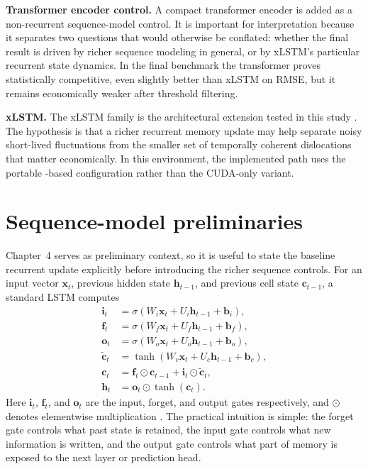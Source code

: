 \documentclass[12pt]{report}
\newcommand{\code}[1]{\begingroup\ttfamily\path{#1}\endgroup}
\begin{document}
\textbf{Transformer encoder control.} A compact transformer encoder \citep{vaswani2017} is added as a non-recurrent sequence-model control. It is important for interpretation because it separates two questions that would otherwise be conflated: whether the final result is driven by richer sequence modeling in general, or by xLSTM's particular recurrent state dynamics. In the final benchmark the transformer proves statistically competitive, even slightly better than xLSTM on RMSE, but it remains economically weaker after threshold filtering.

\textbf{xLSTM.} The xLSTM family is the architectural extension tested in this study \citep{beck2024xlstm}. The hypothesis is that a richer recurrent memory update may help separate noisy short-lived fluctuations from the smaller set of temporally coherent dislocations that matter economically. In this environment, the implemented path uses the portable \code{mLSTM}-based configuration rather than the CUDA-only \code{sLSTM} variant.

\section{Sequence-model preliminaries}
Chapter~4 serves as preliminary context, so it is useful to state the baseline recurrent update explicitly before introducing the richer sequence controls. For an input vector \(\mathbf{x}_t\), previous hidden state \(\mathbf{h}_{t-1}\), and previous cell state \(\mathbf{c}_{t-1}\), a standard LSTM computes
\begin{align}
\mathbf{i}_t &= \sigma\!\left(W_i \mathbf{x}_t + U_i \mathbf{h}_{t-1} + \mathbf{b}_i\right), \\
\mathbf{f}_t &= \sigma\!\left(W_f \mathbf{x}_t + U_f \mathbf{h}_{t-1} + \mathbf{b}_f\right), \\
\mathbf{o}_t &= \sigma\!\left(W_o \mathbf{x}_t + U_o \mathbf{h}_{t-1} + \mathbf{b}_o\right), \\
\tilde{\mathbf{c}}_t &= \tanh\!\left(W_c \mathbf{x}_t + U_c \mathbf{h}_{t-1} + \mathbf{b}_c\right), \\
\mathbf{c}_t &= \mathbf{f}_t \odot \mathbf{c}_{t-1} + \mathbf{i}_t \odot \tilde{\mathbf{c}}_t, \\
\mathbf{h}_t &= \mathbf{o}_t \odot \tanh\!\left(\mathbf{c}_t\right).
\end{align}
Here \(\mathbf{i}_t\), \(\mathbf{f}_t\), and \(\mathbf{o}_t\) are the input, forget, and output gates respectively, and \(\odot\) denotes elementwise multiplication \citep{hochreiter1997}. The practical intuition is simple: the forget gate controls what past state is retained, the input gate controls what new information is written, and the output gate controls what part of memory is exposed to the next layer or prediction head.
\end{document}

